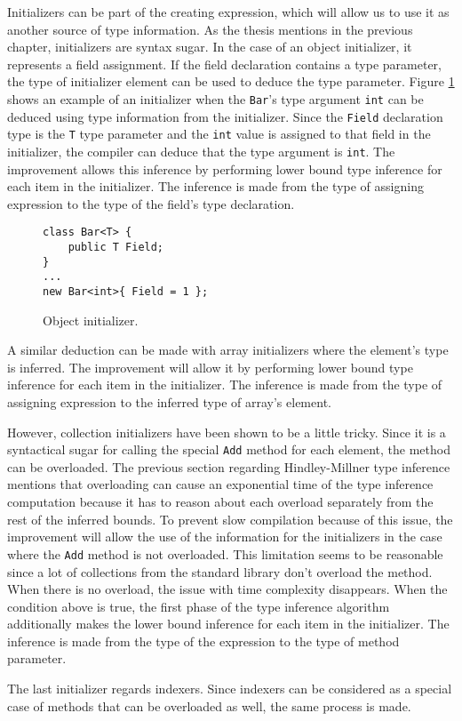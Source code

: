 Initializers can be part of the creating expression, which will allow us to use it as another source of type information. 
As the thesis mentions in the previous chapter, initializers are syntax sugar. 
In the case of an object initializer, it represents a field assignment. 
If the field declaration contains a type parameter, the type of initializer element can be used to deduce the type parameter. 
Figure \ref{img58:initializer} shows an example of an initializer when the \texttt{Bar}’s type argument \texttt{int} can be deduced using type information from the initializer. 
Since the \texttt{Field} declaration type is the \texttt{T} type parameter and the \texttt{int} value is assigned to that field in the initializer, the compiler can deduce that the type argument is \texttt{int}. 
The improvement allows this inference by performing lower bound type inference for each item in the initializer. 
The inference is made from the type of assigning expression to the type of the field’s type declaration.
\begin{figure}[h!]
\begin{lstlisting}[style=csharp, mathescape=true]
class Bar<T> {
    public T Field;
}
...
new Bar<int>{ Field = 1 };
\end{lstlisting}
\caption{Object initializer.}
\label{img58:initializer}
\end{figure}
\par
A similar deduction can be made with array initializers where the element’s type is inferred.
The improvement will allow it by performing lower bound type inference for each item in the initializer. 
The inference is made from the type of assigning expression to the inferred type of array’s element.
\par
However, collection initializers have been shown to be a little tricky. 
Since it is a syntactical sugar for calling the special \texttt{Add} method for each element, the method can be overloaded. 
The previous section regarding Hindley-Millner type inference mentions that overloading can cause an exponential time of the type inference computation because it has to reason about each overload separately from the rest of the inferred bounds. 
To prevent slow compilation because of this issue, the improvement will allow the use of the information for the initializers in the case where the \texttt{Add} method is not overloaded. 
This limitation seems to be reasonable since a lot of collections from the standard library don’t overload the method. 
When there is no overload, the issue with time complexity disappears. 
When the condition above is true, the first phase of the type inference algorithm additionally makes the lower bound inference for each item in the initializer. 
The inference is made from the type of the expression to the type of method parameter.
\par
The last initializer regards indexers.
Since indexers can be considered as a special case of methods that can be overloaded as well, the same process is made.


